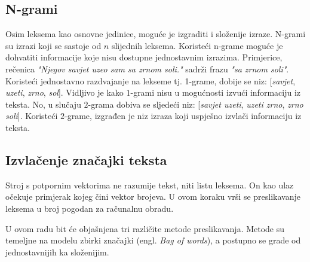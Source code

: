 \documentclass[times, utf8, zavrsni, numeric]{fer}
\begin{document}
\subsection{N-grami}
Osim leksema kao osnovne jedinice, moguće je izgraditi i složenije izraze. 
N-grami su izrazi koji se sastoje od $n$ slijednih leksema.
Koristeći n-grame moguće je dohvatiti informacije koje nisu dostupne jednostavnim izrazima.
Primjerice, rečenica \textit{"Njegov savjet uzeo sam sa zrnom soli."} sadrži frazu 
\textit{"sa zrnom soli"}. Koristeći jednostavno razdvajanje na lekseme tj. 1-grame, dobije se niz: 
[\textit{savjet}, \textit{uzeti}, \textit{zrno}, \textit{sol}].
Vidljivo je kako $1$-grami nisu u mogućnosti izvući informaciju iz teksta.
No, u slučaju $2$-grama dobiva se sljedeći niz: [\textit{savjet uzeti}, \textit{uzeti zrno}, 
\textit{zrno soli}].
Koristeći $2$-grame, izgrađen je niz izraza koji uspješno izvlači informaciju iz teksta.


\subsection{Izvlačenje značajki teksta}
Stroj s potpornim vektorima ne razumije tekst, niti listu leksema. 
On kao ulaz očekuje primjerak kojeg čini vektor brojeva.
U ovom koraku vrši se preslikavanje leksema u broj pogodan za računalnu obradu.

\par U ovom radu bit će objašnjena tri različite metode preslikavanja.
Metode su temeljne na modelu zbirki značajki (engl. \textit{Bag of words}), a postupno se grade od 
jednostavnijih ka složenijim.
\end{document}

